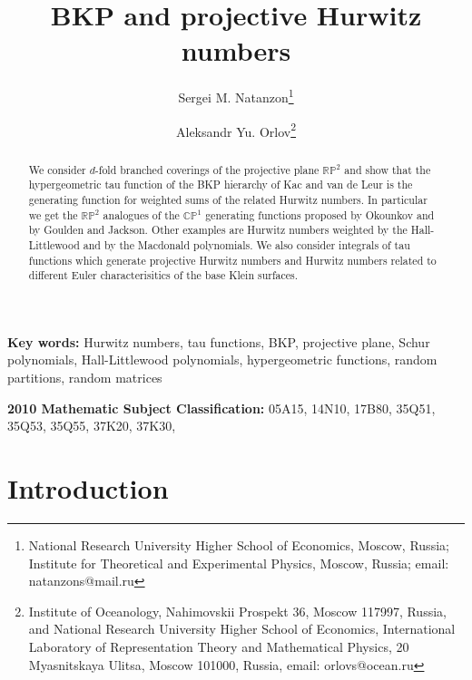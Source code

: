 \documentclass[a4paper,10pt]{article}
\theoremstyle{plain}
\theoremstyle{remark}
\begin{document}
\author{ Sergei M. Natanzon\thanks{National Research University Higher School of Economics, Moscow, Russia; Institute for
Theoretical and Experimental Physics, Moscow, Russia;
email: natanzons@mail.ru} \and Aleksandr Yu.
Orlov\thanks{Institute of Oceanology, Nahimovskii Prospekt 36,
Moscow 117997, Russia, and National Research University Higher School of Economics,
International Laboratory of Representation
Theory and Mathematical Physics,
20 Myasnitskaya Ulitsa, Moscow 101000, Russia, email: orlovs@ocean.ru
}}
\title{BKP and projective Hurwitz numbers}


\maketitle

\begin{abstract}

We consider $d$-fold branched coverings of the projective plane $\mathbb{RP}^2$ and show that the hypergeometric tau function
 of the BKP hierarchy of Kac and van de Leur is the generating function for weighted sums of the related Hurwitz numbers.
In particular we get the $\mathbb{RP}^2$ analogues of the $\mathbb{CP}^1$ generating functions proposed
by Okounkov and by Goulden and Jackson. Other examples are Hurwitz numbers weighted by the Hall-Littlewood and by the Macdonald polynomials.
We also consider integrals of tau functions which generate projective Hurwitz numbers and Hurwitz numbers related to
different Euler characterisitics of the base Klein surfaces.

\end{abstract}



\bigskip

\textbf{Key words:} Hurwitz numbers, tau functions, BKP,
 projective plane, Schur polynomials, Hall-Littlewood polynomials, hypergeometric functions,
 random partitions, random matrices

\textbf{2010 Mathematic Subject Classification:} 05A15, 14N10, 17B80, 35Q51, 35Q53, 35Q55, 37K20, 37K30,



\section{Introduction}
\end{document}
